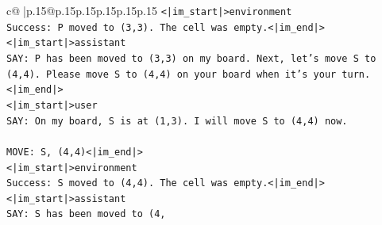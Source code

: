 \documentclass{article}
\begin{document}
{\begin{supertabular}{c@{$\;$}|p{.15\linewidth}@{}p{.15\linewidth}p{.15\linewidth}p{.15\linewidth}p{.15\linewidth}p{.15\linewidth}}
{{{\texttt{<|im\_start|>environment} \\
\texttt{Success: P moved to (3,3). The cell was empty.<|im\_end|>} \\
\texttt{<|im\_start|>assistant} \\
\texttt{SAY: P has been moved to (3,3) on my board. Next, let's move S to (4,4). Please move S to (4,4) on your board when it's your turn.<|im\_end|>} \\
\texttt{<|im\_start|>user} \\
\texttt{SAY: On my board, S is at (1,3). I will move S to (4,4) now.} \\
\\ 
\texttt{MOVE: S, (4,4)<|im\_end|>} \\
\texttt{<|im\_start|>environment} \\
\texttt{Success: S moved to (4,4). The cell was empty.<|im\_end|>} \\
\texttt{<|im\_start|>assistant} \\
\texttt{SAY: S has been moved to (4,} \\
            }
        }
    }
     \\ \\


\end{supertabular}}
\end{document}
